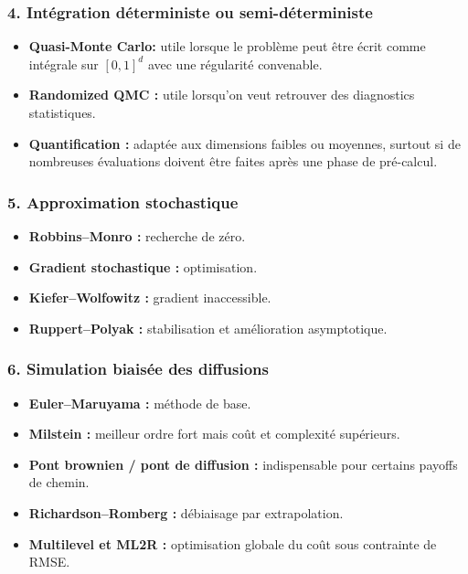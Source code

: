 \documentclass[11pt,a4paper]{article}
\newcommand{\qmc}{Quasi-Monte Carlo}
\begin{document}
\subsubsection*{4. Intégration déterministe ou semi-déterministe}

\begin{itemize}
  \item \textbf{\qmc :} utile lorsque le problème peut être écrit comme intégrale sur $[0,1]^d$ avec une régularité convenable.
  \item \textbf{Randomized QMC :} utile lorsqu'on veut retrouver des diagnostics statistiques.
  \item \textbf{Quantification :} adaptée aux dimensions faibles ou moyennes, surtout si de nombreuses évaluations doivent être faites après une phase de pré-calcul.
\end{itemize}

\subsubsection*{5. Approximation stochastique}

\begin{itemize}
  \item \textbf{Robbins--Monro :} recherche de zéro.
  \item \textbf{Gradient stochastique :} optimisation.
  \item \textbf{Kiefer--Wolfowitz :} gradient inaccessible.
  \item \textbf{Ruppert--Polyak :} stabilisation et amélioration asymptotique.
\end{itemize}

\subsubsection*{6. Simulation biaisée des diffusions}

\begin{itemize}
  \item \textbf{Euler--Maruyama :} méthode de base.
  \item \textbf{Milstein :} meilleur ordre fort mais coût et complexité supérieurs.
  \item \textbf{Pont brownien / pont de diffusion :} indispensable pour certains payoffs de chemin.
  \item \textbf{Richardson--Romberg :} débiaisage par extrapolation.
  \item \textbf{Multilevel et ML2R :} optimisation globale du coût sous contrainte de RMSE.
\end{itemize}
\end{document}

